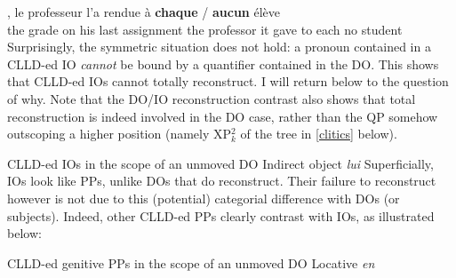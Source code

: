 \documentclass[output=paper]{langsci/langscibook}
\begin{document}
\ea
    ,       le     professeur        l'a rendue
\`{a}  \textbf{chaque} / \textbf{aucun}   \'{e}l\`{e}ve\\
    {}  the    grade  on  his    last       assignment  the   professor   it
     gave      to  each {} no        student\\
\z
%
Surprisingly, the symmetric situation does not hold: a pronoun contained in a
\gls{CLLD}-ed IO {\it cannot} be bound by a quantifier contained in the DO.
This shows that  \gls{CLLD}-ed \glspl{IO} cannot totally reconstruct.
I will return below to the question of why. Note that the DO/IO reconstruction
contrast also shows that total reconstruction is indeed involved in the DO
case, rather than the QP somehow outscoping a higher position (namely XP$_k^2$
of the tree in \eqref{clitics} below).

\ea *CLLD-ed IOs in the scope of an unmoved DO \hfill{Indirect object  {\it lui}} \label{scofree}
\z
\z
%
Superficially, \glspl{IO} look like PPs, unlike \glspl{DO} that do reconstruct.
Their failure to reconstruct  however is not due to this (potential) categorial
difference with \glspl{DO} (or subjects). Indeed, other \gls{CLLD}-ed PPs
clearly contrast with \glspl{IO}, as illustrated below:

\ea \gls{CLLD}-ed genitive PPs in the scope of an unmoved DO \hfill{Locative {\it en}}
\z
\z
\end{document}
